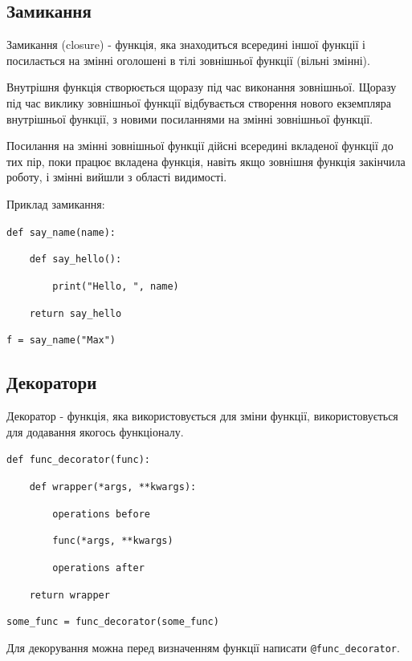 \subsection{Замикання} 
\begin{frame}
Замикання (closure) - функція, яка знаходиться всередині іншої функції і посилається на змінні оголошені в тілі зовнішньої функції (вільні змінні).

Внутрішня функція створюється щоразу під час виконання зовнішньої. Щоразу під час виклику зовнішньої функції відбувається створення нового екземпляра внутрішньої функції, з новими посиланнями на змінні зовнішньої функції.

Посилання на змінні зовнішньої функції дійсні всередині вкладеної функції до тих пір, поки працює вкладена функція, навіть якщо зовнішня функція закінчила роботу, і змінні вийшли з області видимості.
\end{frame}

\begin{frame}
Приклад замикання:

\texttt{def say\_name(name):}
 
\texttt{~~~~def say\_hello():}

\texttt{~~~~~~~~print("Hello, ", name)}

\texttt{~~~~return say\_hello}

\texttt{f = say\_name("Max")}
\end{frame}

\subsection{Декоратори} 
\begin{frame}
Декоратор - функція, яка використовується для зміни функції, використовується для додавання якогось функціоналу.

\texttt{def func\_decorator(func):}

\texttt{~~~~def wrapper(*args, **kwargs):}

\texttt{~~~~~~~~operations before}

\texttt{~~~~~~~~func(*args, **kwargs)}

\texttt{~~~~~~~~operations after}

\texttt{~~~~return wrapper}

\texttt{some\_func = func\_decorator(some\_func)}

Для декорування можна перед визначенням функції написати \texttt{@func\_decorator}.
\end{frame}

